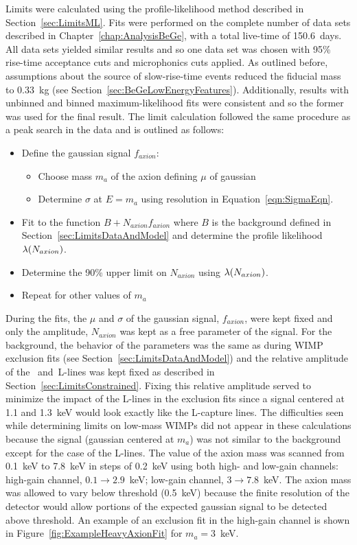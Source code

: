 	Limits were calculated using the profile-likelihood method described in Section~\ref{sec:LimitsML}.  Fits were performed on the complete number of data sets described in Chapter~\ref{chap:AnalysisBeGe}, with a total live-time of 150.6~days.  All data sets yielded similar results and so one data set was chosen with 95\% rise-time acceptance cuts and microphonics cuts applied.  As outlined before, assumptions about the source of slow-rise-time events reduced the fiducial mass to 0.33~kg (see Section~\ref{sec:BeGeLowEnergyFeatures}).  Additionally, results with unbinned and binned maximum-likelihood fits were consistent and so the former was used for the final result.  The limit calculation followed the same procedure as a peak search in the data and is outlined as follows:
		\begin{itemize}
			\item Define the gaussian signal $f_{axion}$: 
			\begin{itemize}
				\item Choose mass $m_{a}$ of the axion defining $\mu$ of gaussian
				\item Determine $\sigma$ at $E = m_{a}$ using resolution in Equation~\ref{eqn:SigmaEqn}.
			\end{itemize}
			\item Fit to the function $B + N_{axion} f_{axion}$ where $B$ is the background defined in Section~\ref{sec:LimitsDataAndModel} and determine the profile likelihood $\lambda(N_{axion})$.
			\item Determine the 90\% upper limit on $N_{axion}$ using $\lambda(N_{axion})$.
			\item Repeat for other values of $m_{a}$
		\end{itemize}		
	
	During the fits, the $\mu$ and $\sigma$ of the gaussian signal, $f_{axion}$, were kept fixed and only the amplitude, $N_{axion}$ was kept as a free parameter of the signal.  For the background, the behavior of the parameters was the same as during WIMP exclusion fits (see Section~\ref{sec:LimitsDataAndModel}) and the relative amplitude of the \gersixeight~and\znsixfive~L-lines was kept fixed as described in Section~\ref{sec:LimitsConstrained}.  Fixing this relative amplitude served to minimize the impact of the L-lines in the exclusion fits since a signal centered at 1.1 and 1.3~keV would look exactly like the L-capture lines.  The difficulties seen while determining limits on low-mass WIMPs did not appear in these calculations because the signal (gaussian centered at $m_{a}$) was not similar to the background except for the case of the L-lines.  The value of the axion mass was scanned from 0.1~keV to 7.8~keV in steps of 0.2~keV using both high- and low-gain channels: high-gain channel, $0.1\to2.9$~keV; low-gain channel, $3\to7.8$~keV.  The axion mass was allowed to vary below threshold (0.5~keV) because the finite resolution of the detector would allow portions of the expected gaussian signal to be detected above threshold.  An example of an exclusion fit in the high-gain channel is shown in Figure~\ref{fig:ExampleHeavyAxionFit} for $m_{a}=3$~keV.  

